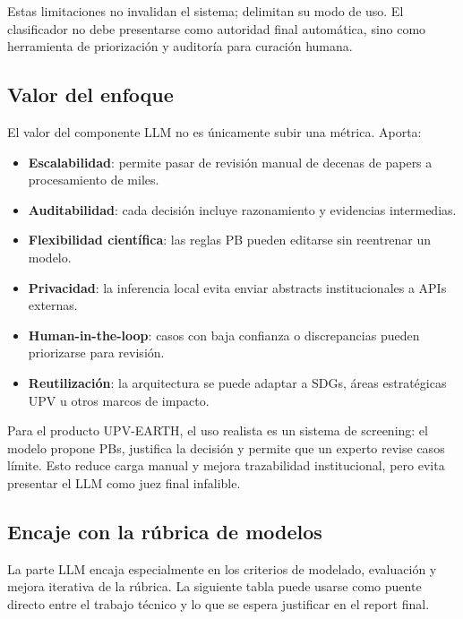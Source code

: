 Estas limitaciones no invalidan el sistema; delimitan su modo de uso. El clasificador no debe presentarse como autoridad final automática, sino como herramienta de priorización y auditoría para curación humana.

\subsection{Valor del enfoque}

El valor del componente LLM no es únicamente subir una métrica. Aporta:

\begin{itemize}
\item \textbf{Escalabilidad}: permite pasar de revisión manual de decenas de papers a procesamiento de miles.
\item \textbf{Auditabilidad}: cada decisión incluye razonamiento y evidencias intermedias.
\item \textbf{Flexibilidad científica}: las reglas PB pueden editarse sin reentrenar un modelo.
\item \textbf{Privacidad}: la inferencia local evita enviar abstracts institucionales a APIs externas.
\item \textbf{Human-in-the-loop}: casos con baja confianza o discrepancias pueden priorizarse para revisión.
\item \textbf{Reutilización}: la arquitectura se puede adaptar a SDGs, áreas estratégicas UPV u otros marcos de impacto.
\end{itemize}

Para el producto UPV-EARTH, el uso realista es un sistema de screening: el modelo propone PBs, justifica la decisión y permite que un experto revise casos límite. Esto reduce carga manual y mejora trazabilidad institucional, pero evita presentar el LLM como juez final infalible.

\subsection{Encaje con la rúbrica de modelos}

La parte LLM encaja especialmente en los criterios de modelado, evaluación y mejora iterativa de la rúbrica. La siguiente tabla puede usarse como puente directo entre el trabajo técnico y lo que se espera justificar en el report final.

